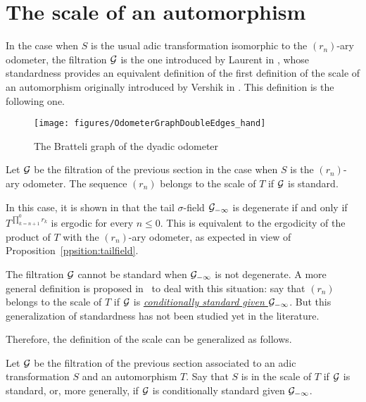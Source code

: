 \documentclass[12pt,a4paper]{article}
\begin{document}
\section{The scale of an automorphism}

In the case when $S$ is the usual adic transformation isomorphic to 
the $(r_n)$-ary odometer, 
the filtration $\mathcal{G}$ is the one introduced by Laurent in \cite{LauXLV}, 
whose standardness provides an equivalent definition of the first 
definition of the scale of an automorphism originally introduced by Vershik in \cite{thescale}. 
This definition is the following one. 

\begin{figure}[!h]
\centering
	\texttt{[image: figures/OdometerGraphDoubleEdges\_hand]}
\caption{The Bratteli graph of the dyadic odometer}
\label{fig:graphodometer}
\end{figure}

\begin{definition}
Let $\mathcal{G}$ be the filtration of the previous section in the case when 
$S$ is the $(r_n)$-ary odometer. 
The sequence $(r_n)$ belongs to the scale of $T$ if $\mathcal{G}$ is standard. 
\end{definition}

In this case, it is shown in \cite{LauXLV} that the tail $\sigma$-field $\mathcal{G}_{-\infty}$ 
is degenerate if and only if $T^{\prod_{k=n+1}^{0}r_k}$ is ergodic for every $n \leq 0$. 
This is equivalent to the ergodicity of the product of $T$ 
with the $(r_n)$-ary odometer, as expected in view of Proposition~\ref{ppsition:tailfield}. 

The filtration $\mathcal{G}$ cannot be standard when $\mathcal{G}_{-\infty}$ is not degenerate. 
A more general definition is proposed in~\cite{LauXLV} to deal with this situation: 
say that  $(r_n)$ belongs to the scale of $T$ if $\mathcal{G}$ is 
\uline{\emph{conditionally standard given $\mathcal{G}_{-\infty}$}}. 
But this generalization of standardness has not been studied yet in the literature. 

Therefore, the definition of the scale can be generalized as follows. 

\begin{definition}
Let $\mathcal{G}$ be the filtration of the previous section associated to an adic 
transformation $S$ and an automorphism $T$. Say that $S$ is in the scale 
of $T$ if $\mathcal{G}$ is standard, or, more generally, if $\mathcal{G}$ is conditionally standard 
given $\mathcal{G}_{-\infty}$. 
\end{definition}
\end{document}
